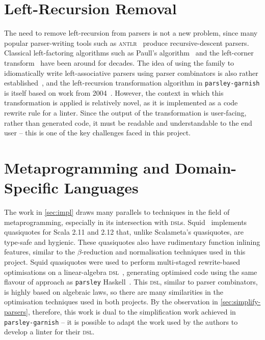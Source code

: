 \documentclass[../../main.tex]{subfiles}
\begin{document}
\section{Left-Recursion Removal}
The need to remove left-recursion from parsers is not a new problem, since many popular parser-writing tools such as \textsc{antlr}~\cite{parr_antlr_2013} produce recursive-descent parsers.
Classical left-factoring algorithms such as Paull's algorithm~\cite{moore_removing_2000} and the left-corner transform~\cite{rosenkrantz_deterministic_1970} have been around for decades.
The idea of using the  family to idiomatically write left-associative parsers using parser combinators is also rather established~\cite{fokker_functional_1995}, and the left-recursion transformation algorithm in \texttt{parsley-garnish} is itself based on work from 2004~\cite{baars_leftrec_2004}.
However, the context in which this transformation is applied is relatively novel, as it is implemented as a code rewrite rule for a linter.
Since the output of the transformation is user-facing, rather than generated code, it must be readable and understandable to the end user -- this is one of the key challenges faced in this project.

\section{Metaprogramming and Domain-Specific Languages}
The work in \cref{sec:impl} draws many parallels to techniques in the field of metaprogramming, especially in its intersection with \textsc{dsl}s.
Squid~\cite{parreaux_squid_2017,parreaux_quoted_2017,parreaux_unifying_2017} implements quasiquotes for Scala 2.11 and 2.12 that, unlike Scalameta's quasiquotes, are type-safe and hygienic.
These quasiquotes also have rudimentary function inlining features, similar to the $\beta$-reduction and normalisation techniques used in this project.
Squid quasiquotes were used to perform multi-staged rewrite-based optimisations on a linear-algebra \textsc{dsl}~\cite{shaikhna_finally_2019}, generating optimised code using the same flavour of approach as \texttt{parsley} Haskell~\cite{willis_staged_2023,willis_parsley_2024}.
This \textsc{dsl}, similar to parser combinators, is highly based on algebraic laws, so there are many similarities in the optimisation techniques used in both projects.
By the observation in \cref{sec:simplify-parsers}, therefore, this work is dual to the simplification work achieved in \texttt{parsley-garnish} -- it is possible to adapt the work used by the authors to develop a linter for their \textsc{dsl}.
\end{document}
